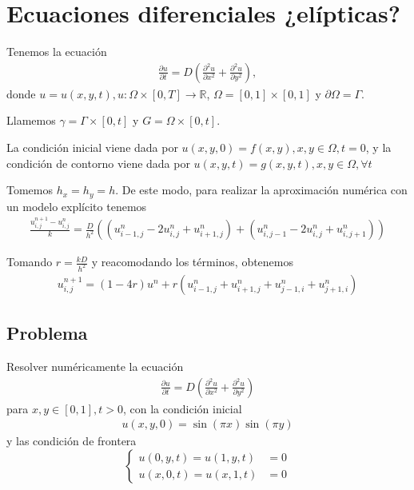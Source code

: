 \documentclass[a4paper]{article}
\begin{document}
\section{Ecuaciones diferenciales ¿elípticas?}

Tenemos la ecuación
\begin{align*}
  \frac{\partial u}{\partial t} = D \left(\frac{\partial^2 u}{\partial x^2} + \frac{\partial^2 u}{\partial y^2}\right),
\end{align*}
donde $u = u(x, y, t), u: \Omega \times [0, T] \to \mathbb{R}$, $\Omega = [0, 1] \times [0, 1]$
y $\partial \Omega = \Gamma$.

Llamemos $\gamma = \Gamma \times [0, t]$ y $G = \Omega \times [0, t]$.

La condición inicial viene dada por $u(x, y, 0) = f(x, y), x, y \in \Omega, t = 0$, y la
condición de contorno viene dada por $u(x, y, t) = g(x, y, t), x, y \in \Omega, \forall t$


Tomemos $h_x = h_y = h$. De este modo, para realizar la aproximación numérica con un modelo
explícito tenemos
\begin{align*}
  \frac{u_{i,j}^{n+1} - u_{i,j}^n}{k} = \frac{D}{h^2} \left( (u_{i-1,j}^n - 2 u_{i,j}^n + u_{i+1,j}^n) +
                                                             (u_{i,j-1}^n - 2 u_{i,j}^n + u_{i,j+1}^n) \right)
\end{align*}

Tomando $r = \frac{k D}{h^2}$ y reacomodando los términos, obtenemos
\begin{align*}
  u_{i,j}^{n+1} = (1 - 4 r) u_{}^n + r (u_{i-1,j}^n + u_{i+1,j}^n + u_{j-1,i}^n + u_{j+1,i}^n)
\end{align*}


\subsection{Problema}
Resolver numéricamente la ecuación
\begin{align*}
  \frac{\partial u}{\partial t} = D \left( \frac{\partial^2 u}{\partial x^2} + \frac{\partial^2 u}{\partial y^2} \right)
\end{align*}
para $x, y \in [0, 1], t > 0$, con la condición inicial
\begin{align*}
  u(x, y, 0) = \sin(\pi x) \sin(\pi y)
\end{align*}
y las condición de frontera
\[ \begin{cases}
  u(0, y, t) = u(1, y, t) &= 0 \\[6pt]
  u(x, 0, t) = u(x, 1, t) &= 0
\end{cases} \]
\end{document}
